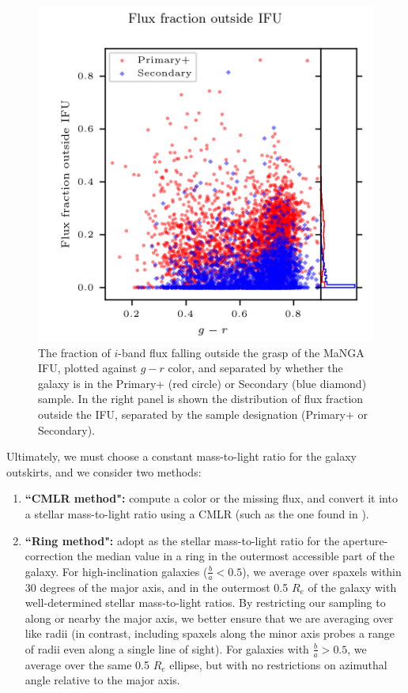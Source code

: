 \begin{figure}
    \centering
    \includegraphics[width=\columnwidth]{flux_outside_ifu}
    \caption[The flux fraction assumed outside the MaNGa IFU]{\fixspacing The fraction of $i$-band flux falling outside the grasp of the MaNGA IFU, plotted against $g-r$ color, and separated by whether the galaxy is in the Primary+ (red circle) or Secondary (blue diamond) sample. In the right panel is shown the distribution of flux fraction outside the IFU, separated by the sample designation (Primary+ or Secondary).}
    \label{fig:flux_outside_ifu}
\end{figure}

Ultimately, we must choose a constant mass-to-light ratio for the galaxy outskirts, and we consider two methods:

\begin{enumerate}
    \item \textbf{``CMLR method":} compute a color or the missing flux, and convert it into a stellar mass-to-light ratio using a CMLR (such as the one found in \citealt{pace_19a_pca}).
    \item \textbf{``Ring method":} adopt as the stellar mass-to-light ratio for the aperture-correction the median value in a ring in the outermost accessible part of the galaxy. For high-inclination galaxies ($\frac{b}{a} < 0.5$), we average over spaxels within 30 degrees of the major axis, and in the outermost 0.5 $R_e$ of the galaxy with well-determined stellar mass-to-light ratios. By restricting our sampling to along or nearby the major axis, we better ensure that we are averaging over like radii (in contrast, including spaxels along the minor axis probes a range of radii even along a single line of sight). For galaxies with $\frac{b}{a} > 0.5$, we average over the same 0.5 $R_e$ ellipse, but with no restrictions on azimuthal angle relative to the major axis.
\end{enumerate}


